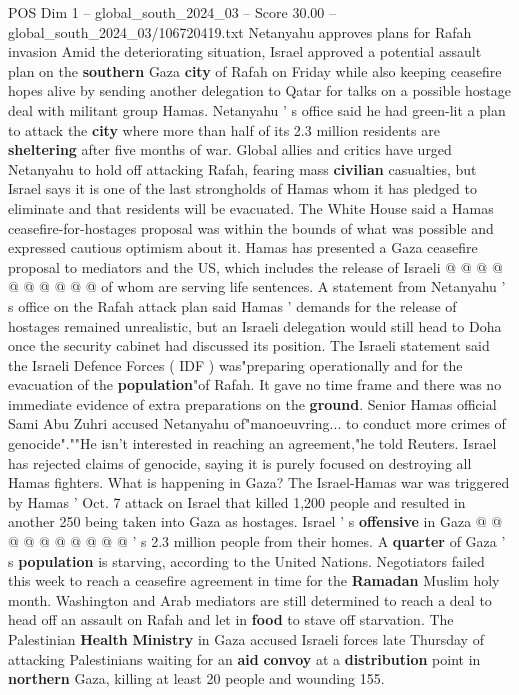 \begin{textsample}{POS Dim 1 – global\_south\_2024\_03 – Score 30.00 – global\_south\_2024\_03/106720419.txt}
Netanyahu approves plans for Rafah invasion Amid the deteriorating situation, Israel approved a potential assault plan on the \textbf{southern} Gaza \textbf{city} of Rafah on Friday while also keeping ceasefire hopes alive by sending another delegation to Qatar for talks on a possible hostage deal with militant group Hamas.
Netanyahu ' s office said he had green-lit a plan to attack the \textbf{city} where more than half of its 2.3 million residents are \textbf{sheltering} after five months of war.
Global allies and critics have urged Netanyahu to hold off attacking Rafah, fearing mass \textbf{civilian} casualties, but Israel says it is one of the last strongholds of Hamas whom it has pledged to eliminate and that residents will be evacuated.
The White House said a Hamas ceasefire-for-hostages proposal was within the bounds of what was possible and expressed cautious optimism about it.
Hamas has presented a Gaza ceasefire proposal to mediators and the US, which includes the release of Israeli @ @ @ @ @ @ @ @ @ @ of whom are serving life sentences.
A statement from Netanyahu ' s office on the Rafah attack plan said Hamas ' demands for the release of hostages remained unrealistic, but an Israeli delegation would still head to Doha once the security cabinet had discussed its position.
The Israeli statement said the Israeli Defence Forces ( IDF ) was"preparing operationally and for the evacuation of the \textbf{population}"of Rafah.
It gave no time frame and there was no immediate evidence of extra preparations on the \textbf{ground}.
Senior Hamas official Sami Abu Zuhri accused Netanyahu of"manoeuvring... to conduct more crimes of genocide".""He isn't interested in reaching an agreement,"he told Reuters.
Israel has rejected claims of genocide, saying it is purely focused on destroying all Hamas fighters.
What is happening in Gaza?
The Israel-Hamas war was triggered by Hamas ' Oct. 7 attack on Israel that killed 1,200 people and resulted in another 250 being taken into Gaza as hostages.
Israel ' s \textbf{offensive} in Gaza @ @ @ @ @ @ @ @ @ @ ' s 2.3 million people from their homes.
A \textbf{quarter} of Gaza ' s \textbf{population} is starving, according to the United Nations.
Negotiators failed this week to reach a ceasefire agreement in time for the \textbf{Ramadan} Muslim holy month.
Washington and Arab mediators are still determined to reach a deal to head off an assault on Rafah and let in \textbf{food} to stave off starvation.
The Palestinian \textbf{Health} \textbf{Ministry} in Gaza accused Israeli forces late Thursday of attacking Palestinians waiting for an \textbf{aid} \textbf{convoy} at a \textbf{distribution} point in \textbf{northern} Gaza, killing at least 20 people and wounding 155.

\end{textsample}
